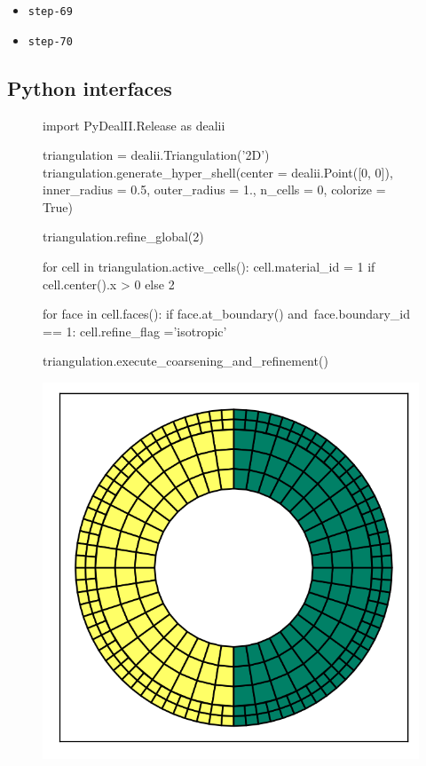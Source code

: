\documentclass{ansarticle-preprint}
\begin{document}
\begin{itemize}
\item \texttt{step-69}

\item \texttt{step-70}
\end{itemize}


\subsection{Python interfaces}
\label{subsec:python}

\begin{figure}
\renewcommand\figurename{Listing}

\centering

\begin{python}
import PyDealII.Release as dealii

triangulation = dealii.Triangulation('2D')
triangulation.generate_hyper_shell(center = dealii.Point([0, 0]), 
                    inner_radius = 0.5, outer_radius = 1.,
                    n_cells = 0, colorize = True)

triangulation.refine_global(2)

for cell in triangulation.active_cells():
    cell.material_id = 1 if cell.center().x > 0 else 2
    
    for face in cell.faces():
        if face.at_boundary() and\
           face.boundary_id == 1:
            cell.refine_flag ='isotropic'
            
triangulation.execute_coarsening_and_refinement()
\end{python}

\includegraphics{python_mesh.png}


\end{figure}
\end{document}
